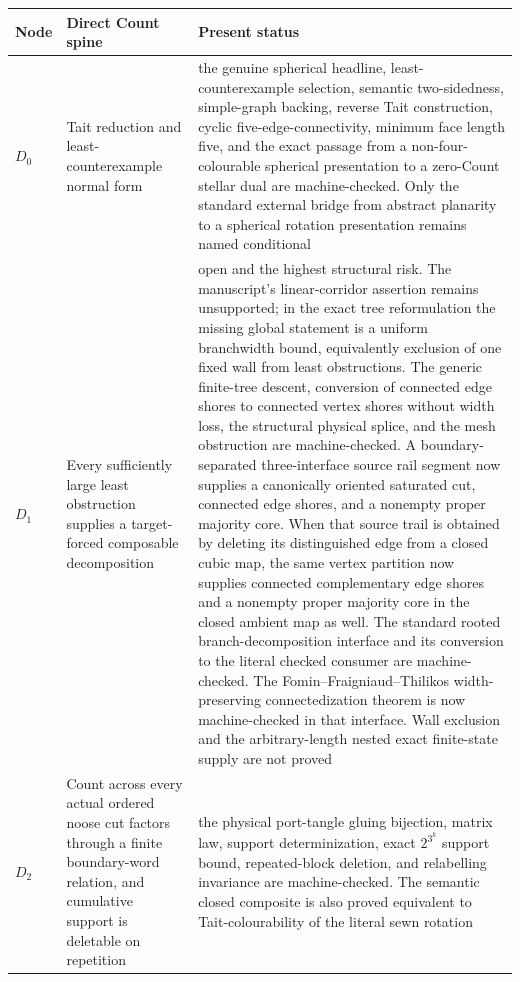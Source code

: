 \begin{center}
\small
\begin{tabular}{@{}p{}p{}p{}@{}}
\toprule
Node & Direct Count spine & Present status \\
\midrule
$D_0$ & Tait reduction and least-counterexample normal form & the genuine
spherical headline, least-counterexample selection, semantic two-sidedness,
simple-graph backing, reverse Tait construction, cyclic five-edge-connectivity,
minimum face length five, and the exact passage from a non-four-colourable
spherical presentation to a zero-Count stellar dual are machine-checked.  Only
the standard external
bridge from abstract planarity to a spherical rotation presentation remains
named conditional \\
$D_1$ & Every sufficiently large least obstruction supplies a target-forced
composable decomposition & open and the highest structural risk.  The
manuscript's linear-corridor assertion remains unsupported; in the exact
tree reformulation the missing global statement is a uniform branchwidth
bound, equivalently exclusion of one fixed wall from least obstructions.
The generic finite-tree descent, conversion of connected edge shores to
connected vertex shores without width loss, the structural physical splice,
and the mesh obstruction are machine-checked.  A boundary-separated
three-interface source rail segment now supplies a canonically oriented
saturated cut, connected edge shores, and a nonempty proper majority core.
When that source trail is obtained by deleting its distinguished edge from a
closed cubic map, the same vertex partition now supplies connected
complementary edge shores and a nonempty proper majority core in the closed
ambient map as well.
The standard rooted branch-decomposition interface and its conversion to the
literal checked consumer are machine-checked.  The Fomin--Fraigniaud--Thilikos
width-preserving connectedization theorem is now machine-checked in that
interface.  Wall exclusion and the arbitrary-length nested exact finite-state
supply are not proved \\
$D_2$ & Count across every actual ordered noose cut factors through a finite
boundary-word relation, and cumulative support is deletable on repetition &
the physical port-tangle gluing bijection, matrix law, support
determinization, exact $2^{3^k}$ support bound, repeated-block deletion, and
relabelling invariance are machine-checked.  The semantic closed composite is
also proved equivalent to Tait-colourability of the literal sewn rotation

\end{tabular}
\end{center}
